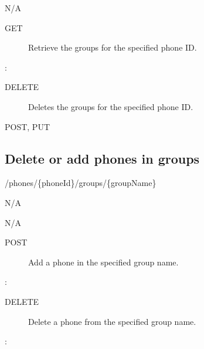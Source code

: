 \documentclass[letterpaper,10pt,english]{sphinxmanual}
\begin{document}
 N/A
\begin{description}
\item[{ GET}] \leavevmode
Retrieve the groups for the specified phone ID.

\end{description}

:

\begin{sphinxVerbatim}[commandchars=\\\{\}]
\end{sphinxVerbatim}
\begin{description}
\item[{ DELETE}] \leavevmode
Deletes the groups for the specified phone ID.

\end{description}

 POST, PUT


\subsection{Delete or add phones in groups}
\label{\detokenize{restapi:delete-or-add-phones-in-groups}}
 /phones/\{phoneId\}/groups/\{groupName\}

 N/A

 N/A
\begin{description}
\item[{ POST}] \leavevmode
Add a phone in the specified group name.

\end{description}

:

\begin{sphinxVerbatim}[commandchars=\\\{\}]
\end{sphinxVerbatim}
\begin{description}
\item[{ DELETE}] \leavevmode
Delete a phone from the specified group name.

\end{description}

:
\end{document}

